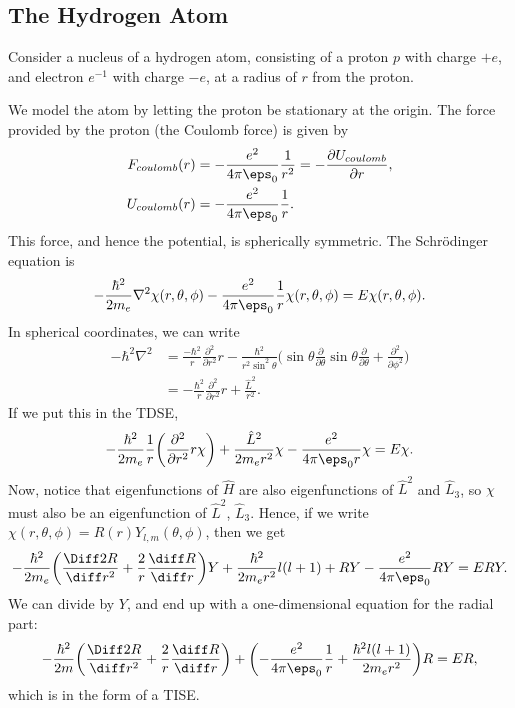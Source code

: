 \documentclass[12pt]{article}
\begin{document}
\subsection{The Hydrogen Atom}%
\label{sub:the_hydrogen_atom}

Consider a nucleus of a hydrogen atom, consisting of a proton $p$ with charge $+e$, and electron $e^{-1}$ with charge $-e$, at a radius of $r$ from the proton.

We model the atom by letting the proton be stationary at the origin. The force provided by the proton (the Coulomb force) is given by
\begin{align*}
	F_{coulomb}(r) &= - \frac{e^2}{4 \pi \eps_0} \frac{1}{r^2} = - \frac{\partial U_{coulomb}}{\partial r}, \\
	U_{coulomb}(r) &= - \frac{e^2}{4 \pi \eps_0} \frac{1}{r}.
\end{align*}
This force, and hence the potential, is spherically symmetric. The Schr\"{o}dinger equation is
\[
	- \frac{\hbar^2}{2m_e} \nabla^2\chi(r, \theta, \phi) - \frac{e^2}{4 \pi \eps_0}\frac{1}{r} \chi(r, \theta, \phi) = E \chi(r, \theta, \phi)
.\]
In spherical coordinates, we can write
\begin{align*}
	- \hbar^2 \nabla^2 &= \frac{-\hbar^2}{r} \frac{\partial^2}{\partial r^2}r - \frac{\hbar^2}{r^2\sin^2 \theta} \biggl( \sin \theta \frac{\partial}{\partial \theta} \sin \theta \frac{\partial}{\partial \theta} + \frac{\partial^2}{\partial \phi^2} \biggr) \\
			   &= - \frac{\hbar^2}{r} \frac{\partial^2}{\partial r^2} r + \frac{\hat L^2}{r^2}.
\end{align*} 
If we put this in the TDSE,
\[
	- \frac{\hbar^2}{2m_e} \frac{1}{r} \biggl( \frac{\partial^2}{\partial r^2} r \chi \biggr) + \frac{\hat L^2}{2m_e r^2} \chi - \frac{e^2}{4 \pi \eps_0 r} \chi = E \chi
.\]
Now, notice that eigenfunctions of $\hat H$ are also eigenfunctions of $\hat L^2$ and $\hat L_3$, so $\chi$ must also be an eigenfunction of $\hat L^2$, $\hat L_3$. Hence, if we write $\chi(r, \theta, \phi) = R(r) Y_{l,m}(\theta, \phi)$, then we get
\[
	- \frac{\hbar^2}{2m_e} \biggl( \frac{\Diff2 R}{\diff r^2} + \frac{2}{r} \frac{\diff R}{\diff r} \biggr) Y + \frac{\hbar^2}{2m_e r^2} l(l+1) + RY - \frac{e^2}{4 \pi \eps_0}RY = ERY
.\]
We can divide by $Y$, and end up with a one-dimensional equation for the radial part:
\[
	- \frac{\hbar^2}{2m} \biggl( \frac{\Diff2 R}{\diff r^2} + \frac{2}{r} \frac{\diff R}{\diff r} \biggr) + \biggl( - \frac{e^2}{4 \pi \eps_0}\frac{1}{r} + \frac{\hbar^2 l(l+1)}{2m_e r^2} \biggr)R = ER
,\]
which is in the form of a TISE.
\end{document}
